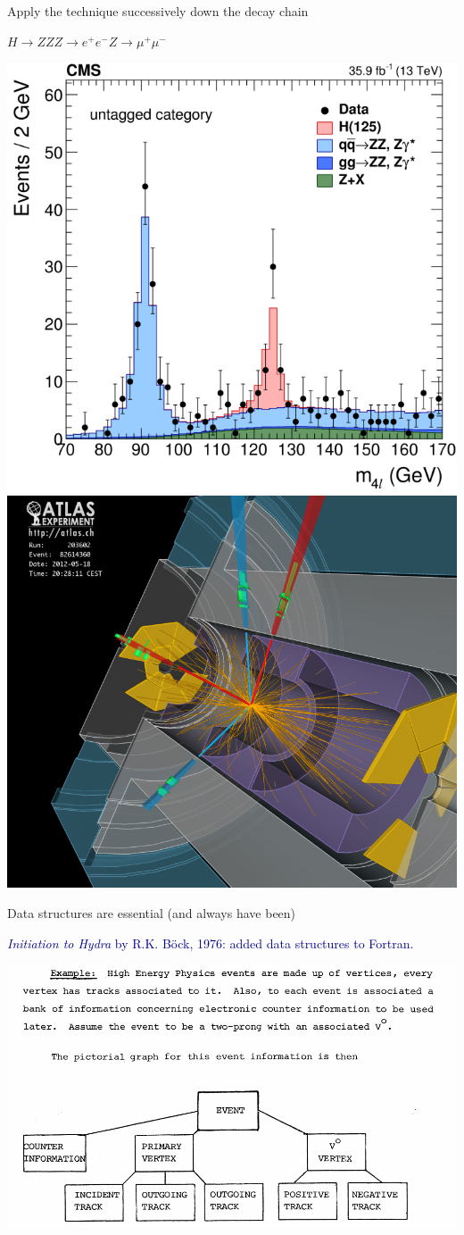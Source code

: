 \documentclass[aspectratio=169]{beamer}
\begin{document}
\begin{frame}{Apply the technique successively down the decay chain}
\Large
\begin{center}
$H \to ZZ$\hspace{1 cm}$Z \to e^+e^-$\hspace{1 cm}$Z \to \mu^+\mu^-$
\end{center}

\includegraphics[height=6 cm]{img/higgs-to-four-leptons.png}\hfill\includegraphics[height=6 cm]{img/higgs-to-four-leptons-2.png}
\end{frame}

\begin{frame}{Data structures are essential (and always have been)}
\large
\vspace{0.5 cm}

\vspace{0.25 cm}
\textcolor{darkblue}{{\it Initiation to Hydra} by R.K. B\"ock, 1976: added data structures to Fortran.}

\begin{center}
\includegraphics[width=0.7\linewidth]{img/hydra-3.png}
\end{center}
\end{frame}
\end{document}
